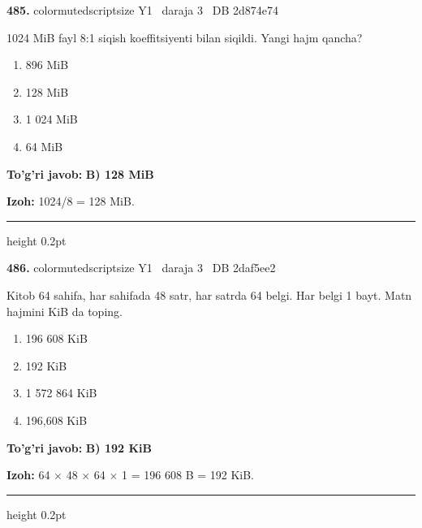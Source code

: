 \documentclass[10pt,a4paper,oneside]{article}
\begin{document}
\noindent\textbf{\color{ink}485.}  {color{muted}scriptsize Y1 \textbullet\ daraja 3 \textbullet\ DB 2d874e74}
\par
1024 MiB fayl 8:1 siqish koeffitsiyenti bilan siqildi. Yangi hajm qancha?
\begin{enumerate}[label=\Alph*),leftmargin=9mm]
\item 896 MiB
\item 128 MiB
\item 1 024 MiB
\item 64 MiB
\end{enumerate}
\begin{tcolorbox}[enhanced,breakable,colback=teal!4,colframe=teal!50!black,boxrule=0.5pt,arc=1.1mm,left=3mm,right=3mm,top=1.7mm,bottom=1.7mm,before skip=2mm,after skip=2mm]
\textbf{\color{teal}To'g'ri javob:} \textbf{B) 128 MiB}
\par\smallskip
\textbf{Izoh:} 1024/8 = 128 MiB.
\end{tcolorbox}
\vspace{2mm}\hrule height 0.2pt \vspace{3mm}

\noindent\textbf{\color{ink}486.}  {color{muted}scriptsize Y1 \textbullet\ daraja 3 \textbullet\ DB 2daf5ee2}
\par
Kitob 64 sahifa, har sahifada 48 satr, har satrda 64 belgi. Har belgi 1 bayt. Matn hajmini KiB da toping.
\begin{enumerate}[label=\Alph*),leftmargin=9mm]
\item 196 608 KiB
\item 192 KiB
\item 1 572 864 KiB
\item 196,608 KiB
\end{enumerate}
\begin{tcolorbox}[enhanced,breakable,colback=teal!4,colframe=teal!50!black,boxrule=0.5pt,arc=1.1mm,left=3mm,right=3mm,top=1.7mm,bottom=1.7mm,before skip=2mm,after skip=2mm]
\textbf{\color{teal}To'g'ri javob:} \textbf{B) 192 KiB}
\par\smallskip
\textbf{Izoh:} 64 \ensuremath{\times} 48 \ensuremath{\times} 64 \ensuremath{\times} 1 = 196 608 B = 192 KiB.
\end{tcolorbox}
\vspace{2mm}\hrule height 0.2pt \vspace{3mm}
\end{document}
